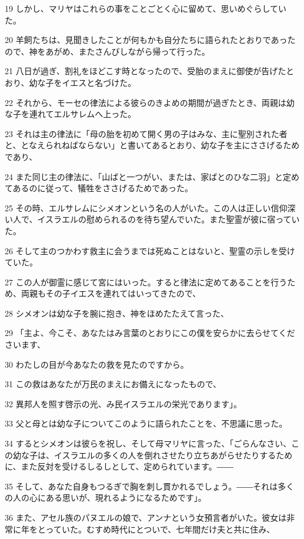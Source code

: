\par 19 しかし、マリヤはこれらの事をことごとく心に留めて、思いめぐらしていた。
\par 20 羊飼たちは、見聞きしたことが何もかも自分たちに語られたとおりであったので、神をあがめ、またさんびしながら帰って行った。
\par 21 八日が過ぎ、割礼をほどこす時となったので、受胎のまえに御使が告げたとおり、幼な子をイエスと名づけた。
\par 22 それから、モーセの律法による彼らのきよめの期間が過ぎたとき、両親は幼な子を連れてエルサレムへ上った。
\par 23 それは主の律法に「母の胎を初めて開く男の子はみな、主に聖別された者と、となえられねばならない」と書いてあるとおり、幼な子を主にささげるためであり、
\par 24 また同じ主の律法に、「山ばと一つがい、または、家ばとのひな二羽」と定めてあるのに従って、犠牲をささげるためであった。
\par 25 その時、エルサレムにシメオンという名の人がいた。この人は正しい信仰深い人で、イスラエルの慰められるのを待ち望んでいた。また聖霊が彼に宿っていた。
\par 26 そして主のつかわす救主に会うまでは死ぬことはないと、聖霊の示しを受けていた。
\par 27 この人が御霊に感じて宮にはいった。すると律法に定めてあることを行うため、両親もその子イエスを連れてはいってきたので、
\par 28 シメオンは幼な子を腕に抱き、神をほめたたえて言った、
\par 29 「主よ、今こそ、あなたはみ言葉のとおりにこの僕を安らかに去らせてくださいます、
\par 30 わたしの目が今あなたの救を見たのですから。
\par 31 この救はあなたが万民のまえにお備えになったもので、
\par 32 異邦人を照す啓示の光、み民イスラエルの栄光であります」。
\par 33 父と母とは幼な子についてこのように語られたことを、不思議に思った。
\par 34 するとシメオンは彼らを祝し、そして母マリヤに言った、「ごらんなさい、この幼な子は、イスラエルの多くの人を倒れさせたり立ちあがらせたりするために、また反対を受けるしるしとして、定められています。――
\par 35 そして、あなた自身もつるぎで胸を刺し貫かれるでしょう。――それは多くの人の心にある思いが、現れるようになるためです」。
\par 36 また、アセル族のパヌエルの娘で、アンナという女預言者がいた。彼女は非常に年をとっていた。むすめ時代にとついで、七年間だけ夫と共に住み、
